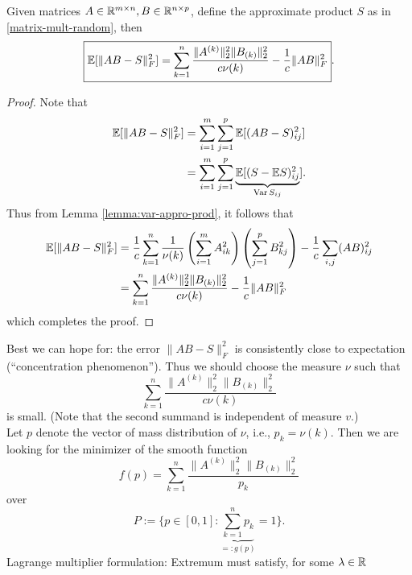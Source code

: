 \begin{lemma} \label{lemma-expected-error-approx-prod}
Given matrices $A\in\mathbb{R}^{m \times n}, B \in \mathbb{R}^{n\times p}$, define the approximate product $S$ as in \eqref{matrix-mult-random}, then
\begin{equation} \label{eq:expected-error}
\boxed{
\mathbb{E}[\|AB-S\|_F^2]= \sum_{k=1}^n \frac{\|A^{(k)}\|_2^2 \|B_{(k)}\|_2^2}{c\nu(k)} - \frac{1}{c} \|AB\|_F^2}.
\end{equation}
\begin{proof}
Note that
\begin{equation*}
\begin{split}
\mathbb{E}[\|AB-S\|_F^2] & = \sum_{i=1}^m \sum_{j=1}^p \mathbb{E} [(AB-S)_{ij}^2] \\
& = \sum_{i=1}^m \sum_{j=1}^p \underbrace{\mathbb{E} [(S-\mathbb{E} S)^2_{ij}}_{\operatorname{Var}S_{ij}}].
\end{split}
\end{equation*}
Thus from Lemma \ref{lemma:var-appro-prod}, it follows that
\begin{equation*}
\begin{split}
\mathbb{E}[\|AB-S\|_F^2] & =  \frac{1}{c}\sum_{k=1}^n \frac{1}{\nu(k)} \left( \sum_{i=1}^m A_{ik}^2 \right)
\left( \sum_{j=1}^p B_{kj}^2  \right)- \frac{1}{c} \sum_{i,j}(AB)_{ij}^2 \\
&= \sum_{k=1}^n \frac{\|A^{(k)}\|_2^2 \|B_{(k)}\|_2^2}{c\nu(k)} - \frac{1}{c} \|AB\|_F^2
\end{split}
\end{equation*}
which completes the proof.
\end{proof}
\end{lemma}
Best we can hope for: the error $\|AB-S\|_F^2$ is consistently close to expectation (``concentration phenomenon''). Thus we should choose the measure $\nu$ such that 
\begin{equation*}
 \sum_{k=1}^n \frac{\|A^{(k)}\|_2^2 \|B_{(k)}\|_2^2}{c\nu(k)}
\end{equation*}
is small. (Note that the second summand is independent of measure $v$.) \\
Let $p$ denote the vector of mass distribution of $\nu$, i.e., $p_k=\nu(k)$. Then we are looking for the minimizer of the smooth function
\begin{equation*}
f(p) = \sum_{k=1}^n \frac{\|A^{(k)}\|_2^2 \|B_{(k)}\|_2^2}{p_k}
\end{equation*}
over
$$
P:=\bigg\{p \in [0,1]: \underbrace{\sum_{k=1}^n p_k}_{=: g(p)} =1\bigg\}.
$$
Lagrange multiplier formulation: Extremum must satisfy, for some $\lambda \in \mathbb{R}$
